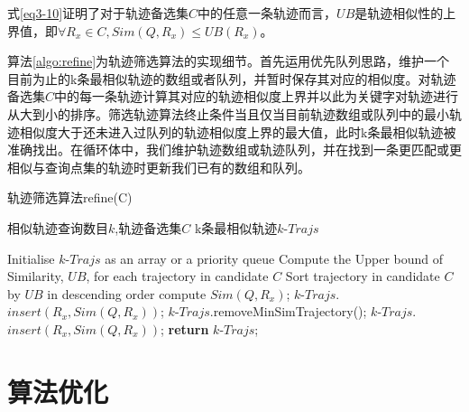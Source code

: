 式\ref{eq3-10}证明了对于轨迹备选集$C$中的任意一条轨迹而言，$UB$是轨迹相似性的上界值，即$\forall R_{x}\in C, Sim(Q,R_{x}) \leq UB(R_{x})$。

算法\ref{algo:refine}为轨迹筛选算法的实现细节。首先运用优先队列思路，维护一个目前为止的k条最相似轨迹的数组或者队列，并暂时保存其对应的相似度。对轨迹备选集$C$中的每一条轨迹计算其对应的轨迹相似度上界并以此为关键字对轨迹进行从大到小的排序。筛选轨迹算法终止条件当且仅当目前轨迹数组或队列中的最小轨迹相似度大于还未进入过队列的轨迹相似度上界的最大值，此时k条最相似轨迹被准确找出。在循环体中，我们维护轨迹数组或轨迹队列，并在找到一条更匹配或更相似与查询点集的轨迹时更新我们已有的数组和队列。

\begin{algorithm}
\caption{轨迹筛选算法refine(C)}
\label{algo:refine}
\begin{algorithmic}[1] %
\Require 相似轨迹查询数目$k$,轨迹备选集$C$
\Ensure k条最相似轨迹$k$-$Trajs$ %

\State Initialise $k$-$Trajs$ as an array or a priority queue
\State Compute the Upper bound of Similarity, $UB$, for each trajectory in candidate $C$
\State Sort trajectory in candidate $C$ by $UB$ in descending order
	\State compute $Sim(Q,R_{x})$;
		\State $k$-$Trajs$.$insert(R_{x},Sim(Q,R_{x}))$;
	\Else 
			\State $k$-$Trajs$.removeMinSimTrajectory();
			\State $k$-$Trajs$.$insert(R_{x},Sim(Q,R_{x}))$;
		\EndIf
			\State \textbf{return} $k$-$Trajs$;
		\EndIf
	\EndIf
\EndFor
\end{algorithmic}
\end{algorithm}


\section{算法优化}
\label{sec:optimization}

